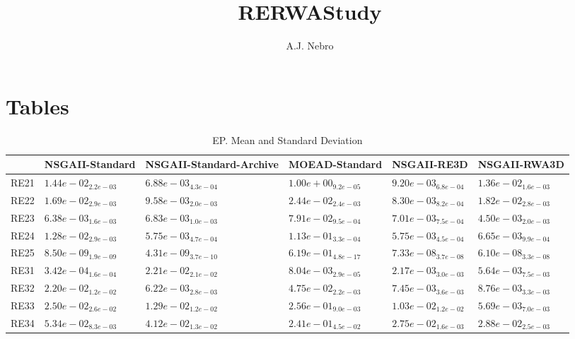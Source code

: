 \documentclass{article}
\title{RERWAStudy}
\author{A.J. Nebro}
\begin{document}
\maketitle
\section{Tables}

\begin{table}
\caption{EP. Mean and Standard Deviation}
\label{table: EP}
\centering
\begin{scriptsize}
\begin{tabular}{llllll}
\hline & NSGAII-Standard & NSGAII-Standard-Archive & MOEAD-Standard & NSGAII-RE3D &  NSGAII-RWA3D\\
\hline 
RE21 & $  1.44e-02_{ 2.2e-03}$ & \cellcolor{gray95}$  6.88e-03_{ 4.3e-04}$ & $  1.00e+00_{ 9.2e-05}$ & \cellcolor{gray25}$  9.20e-03_{ 6.8e-04}$ & $  1.36e-02_{ 1.6e-03}$ \\
RE22 & $  1.69e-02_{ 2.9e-03}$ & \cellcolor{gray25}$  9.58e-03_{ 2.0e-03}$ & $  2.44e-02_{ 2.4e-03}$ & \cellcolor{gray95}$  8.30e-03_{ 8.2e-04}$ & $  1.82e-02_{ 2.8e-03}$ \\
RE23 & \cellcolor{gray25}$  6.38e-03_{ 1.6e-03}$ & $  6.83e-03_{ 1.0e-03}$ & $  7.91e-02_{ 9.5e-04}$ & $  7.01e-03_{ 7.5e-04}$ & \cellcolor{gray95}$  4.50e-03_{ 2.0e-03}$ \\
RE24 & $  1.28e-02_{ 2.9e-03}$ & \cellcolor{gray95}$  5.75e-03_{ 4.7e-04}$ & $  1.13e-01_{ 3.3e-04}$ & \cellcolor{gray25}$  5.75e-03_{ 4.5e-04}$ & $  6.65e-03_{ 9.9e-04}$ \\
RE25 & \cellcolor{gray25}$  8.50e-09_{ 1.9e-09}$ & \cellcolor{gray95}$  4.31e-09_{ 3.7e-10}$ & $  6.19e-01_{ 4.8e-17}$ & $  7.33e-08_{ 3.7e-08}$ & $  6.10e-08_{ 3.3e-08}$ \\
RE31 & \cellcolor{gray95}$  3.42e-04_{ 1.6e-04}$ & $  2.21e-02_{ 2.1e-02}$ & $  8.04e-03_{ 2.9e-05}$ & \cellcolor{gray25}$  2.17e-03_{ 3.0e-03}$ & $  5.64e-03_{ 7.5e-03}$ \\
RE32 & $  2.20e-02_{ 1.2e-02}$ & \cellcolor{gray95}$  6.22e-03_{ 2.8e-03}$ & $  4.75e-02_{ 2.2e-03}$ & \cellcolor{gray25}$  7.45e-03_{ 3.6e-03}$ & $  8.76e-03_{ 3.3e-03}$ \\
RE33 & $  2.50e-02_{ 2.6e-02}$ & $  1.29e-02_{ 1.2e-02}$ & $  2.56e-01_{ 9.0e-03}$ & \cellcolor{gray25}$  1.03e-02_{ 1.2e-02}$ & \cellcolor{gray95}$  5.69e-03_{ 7.0e-03}$ \\
RE34 & $  5.34e-02_{ 8.3e-03}$ & $  4.12e-02_{ 1.3e-02}$ & $  2.41e-01_{ 4.5e-02}$ & \cellcolor{gray95}$  2.75e-02_{ 1.6e-03}$ & \cellcolor{gray25}$  2.88e-02_{ 2.5e-03}$ \\

\end{tabular}
\end{scriptsize}
\end{table}
\end{document}
